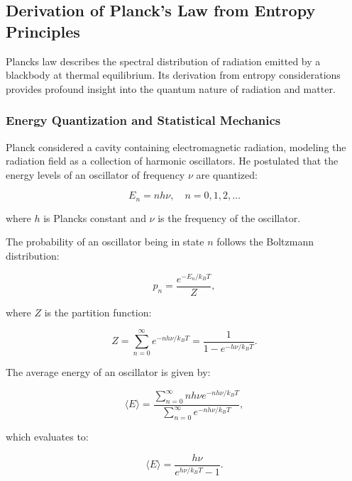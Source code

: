 \subsection{Derivation of Planck's Law from Entropy Principles}

Planck\rqs s law describes the spectral distribution of radiation emitted by a blackbody at thermal equilibrium. Its derivation from entropy considerations provides profound insight into the quantum nature of radiation and matter.

\subsubsection*{Energy Quantization and Statistical Mechanics}

Planck considered a cavity containing electromagnetic radiation, modeling the radiation field as a collection of harmonic oscillators. He postulated that the energy levels of an oscillator of frequency $\nu$ are quantized:

\begin{equation*}
    E_n = n h \nu, \quad n = 0,1,2, \dots
\end{equation*}

where $h$ is Planck\rqs s constant and $\nu$ is the frequency of the oscillator.

The probability of an oscillator being in state $n$ follows the Boltzmann distribution:

\begin{equation*}
    p_n = \frac{e^{-E_n / k_B T}}{Z},
\end{equation*}

where $Z$ is the partition function:

\begin{equation*}
    Z = \sum_{n=0}^{\infty} e^{-n h \nu / k_B T} = \frac{1}{1 - e^{-h \nu / k_B T}}.
\end{equation*}

The average energy of an oscillator is given by:

\begin{equation*}
    \langle E \rangle = \frac{\sum_{n=0}^{\infty} n h \nu e^{-n h \nu / k_B T}}{\sum_{n=0}^{\infty} e^{-n h \nu / k_B T}},
\end{equation*}

which evaluates to:

\begin{equation*}
    \langle E \rangle = \frac{h \nu}{e^{h \nu / k_B T} - 1}.
\end{equation*}

